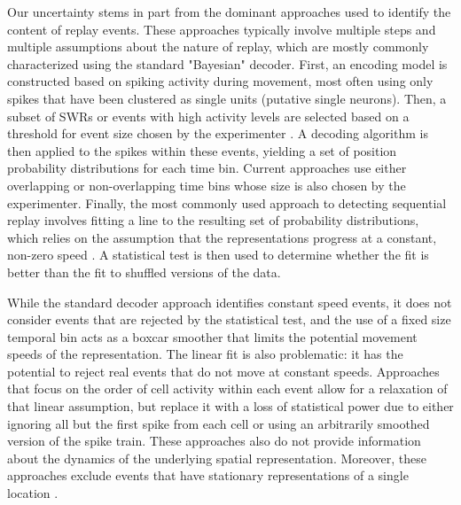 \documentclass[times, twoside]{zHenriquesLab-StyleBioRxiv}
\begin{document}
Our uncertainty stems in part from the dominant approaches used to identify the content of replay events. These approaches typically involve multiple steps and multiple assumptions about the nature of replay, which are mostly commonly characterized using the standard "Bayesian" decoder. First, an encoding model is constructed based on spiking activity during movement, most often using only spikes that have been clustered as single units (putative single neurons). Then, a subset of SWRs or events with high activity levels are selected based on a threshold for event size chosen by the experimenter \cite{FosterReversereplaybehavioural2006, DibaForwardreversehippocampal2007, KarlssonAwakereplayremote2009, StellaHippocampalReactivationRandom2019}. A decoding algorithm is then applied to the spikes within these events, yielding a set of position probability distributions for each time bin. Current approaches use either overlapping or non-overlapping time bins whose size is also chosen by the experimenter. Finally, the most commonly used approach to detecting sequential replay involves fitting a line to the resulting set of probability distributions, which relies on the assumption that the representations progress at a constant, non-zero speed \cite{FosterReversereplaybehavioural2006, DibaForwardreversehippocampal2007, KarlssonAwakereplayremote2009}. A statistical test is then used to determine whether the fit is better than the fit to shuffled versions of the data.

While the standard decoder approach identifies constant speed events, it does not consider events that are rejected by the statistical test, and the use of a fixed size temporal bin acts as a boxcar smoother that limits the potential movement speeds of the representation. The linear fit is also problematic: it has the potential to reject real events that do not move at constant speeds. Approaches that focus on the order of cell activity within each event \cite{LeeMemorySequentialExperience2002, GuptaHippocampalReplayNot2010} allow for a relaxation of that linear assumption, but replace it with a loss of statistical power due to either ignoring all but the first spike from each cell or using an arbitrarily smoothed version of the spike train. These approaches also do not provide information about the dynamics of the underlying spatial representation. Moreover, these approaches exclude events that  have stationary representations of a single location \cite{JaiDistincthippocampalcorticalmemory2017, FarooqEmergencepreconfiguredplastic2019}. 
\end{document}
